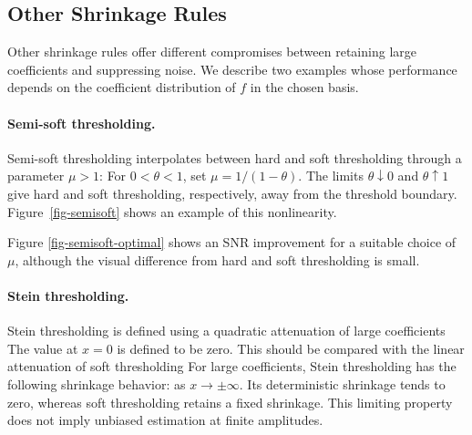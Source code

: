                                                      
\subsection{Other Shrinkage Rules}

Other shrinkage rules offer different compromises between retaining large coefficients and suppressing noise. We describe two examples whose performance depends on the coefficient distribution of $f$ in the chosen basis.

  
\paragraph{Semi-soft thresholding.}

Semi-soft thresholding interpolates between hard and soft thresholding through a parameter $\mu>1$:
For $0<\theta<1$, set $\mu=1/(1-\theta)$. The limits $\theta\downarrow0$ and $\theta\uparrow1$ give hard and soft thresholding, respectively, away from the threshold boundary.
Figure~\ref{fig-semisoft} shows an example of this nonlinearity.


Figure \ref{fig-semisoft-optimal} shows an SNR improvement for a suitable choice of $\mu$, although the visual difference from hard and soft thresholding is small.


  
\paragraph{Stein thresholding.}

Stein thresholding is defined using a quadratic attenuation of large coefficients
The value at $x=0$ is defined to be zero. This should be compared with the linear attenuation of soft thresholding
For large coefficients, Stein thresholding has the following shrinkage behavior:
as $x \rightarrow \pm \infty$. Its deterministic shrinkage tends to zero, whereas soft thresholding retains a fixed shrinkage. This limiting property does not imply unbiased estimation at finite amplitudes.

